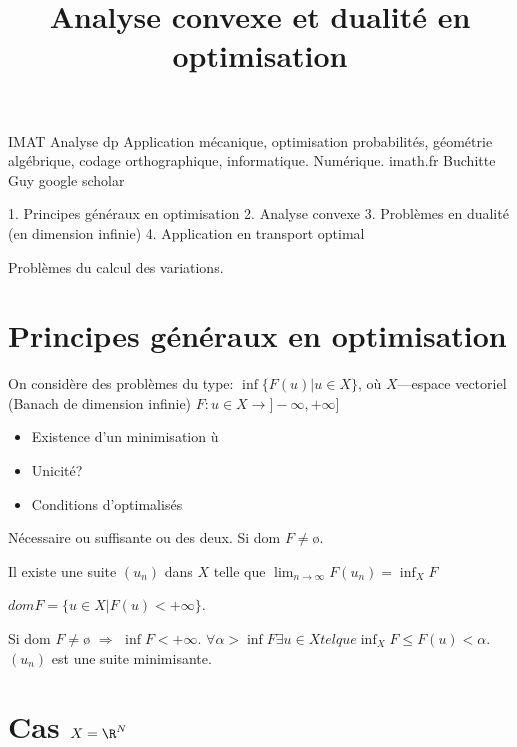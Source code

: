 IMAT
Analyse dp
Application mécanique, optimisation probabilités, géométrie algébrique, codage orthographique, informatique. Numérique.
imath.fr
Buchitte Guy
google scholar

\title {Analyse convexe et dualité en optimisation}
1. Principes généraux en optimisation
2. Analyse convexe
3. Problèmes en dualité (en dimension infinie)
4. Application en transport optimal

Problèmes du calcul des variations.
\section{Principes généraux en optimisation}
On considère des problèmes du type: $\inf\{F(u)|u\in X\}$, où $X$---espace vectoriel (Banach de dimension infinie)
$F:u\in X\rightarrow  ]-∞,+∞]$
\begin{itemize}
	\item Existence d'un minimisation ù
	\item Unicité?
	\item Conditions d'optimalisés
\end{itemize}
Nécessaire ou suffisante ou des deux.
Si dom $F≠ø$.
\begin{remark}
	Il existe une suite $(u_n)$ dans $X$ telle que 
	$\lim_{n\to∞}F(u_n)=\inf_X F$
\end{remark}
\begin{notations}
	$dom F=\{u\in X|F(u)<+∞\}$.
\end{notations}
Si dom $F≠ø$ $\Rightarrow$ $\inf F<+∞$. $\forall α>\inf F \exists u\in X tel que \inf_XF≤F(u)<α$. $(u_n)$ est une suite minimisante.


\section{Cas $X=\R^N$} %
\label{sec:cas_x_r_n}

